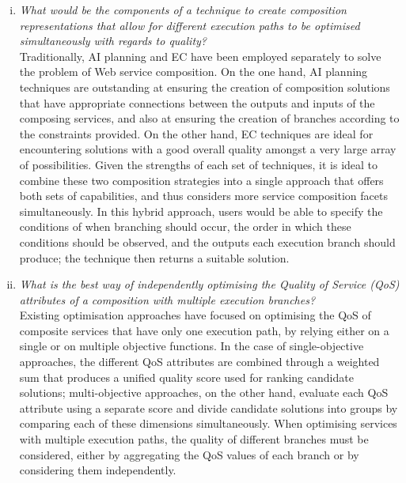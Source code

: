 \begin{enumerate}[(i)]
\item \label{goal:core} \textit{What would be the components of a technique to create composition representations that allow for different execution paths to be optimised simultaneously with regards to quality?}\\
Traditionally, AI planning and EC have been employed separately to solve the problem of Web service composition. On the one hand, AI planning techniques are outstanding at ensuring the creation of composition solutions that have appropriate connections between the outputs and inputs of the composing services, and also at ensuring the creation of branches according to the constraints provided. On the other hand, EC techniques are ideal for encountering solutions with a good overall quality amongst a very large array of possibilities. Given the strengths of each set of techniques, it is ideal to combine these two composition strategies into a single approach that offers both sets of capabilities, and thus considers more service composition facets simultaneously. In this hybrid approach, users would be able to specify the conditions of when branching should occur, the order in which these conditions should be observed, and the outputs each execution branch should produce; the technique then returns a suitable solution.

\item \label{goal:qos} \textit{What is the best way of independently optimising the Quality of Service (QoS) attributes of a composition with multiple execution branches?}\\
Existing optimisation approaches have focused on optimising the QoS of composite services that have only one execution path, by relying either on a single or on multiple objective functions. In the case of single-objective approaches, the different QoS attributes are combined through a weighted sum that produces a unified quality score used for ranking candidate solutions; multi-objective approaches, on the other hand, evaluate each QoS attribute using a separate score and divide candidate solutions into groups by comparing each of these dimensions simultaneously. When optimising services with multiple execution paths, the quality of different branches must be considered, either by aggregating the QoS values of each branch or by considering them independently.


\end{enumerate}
